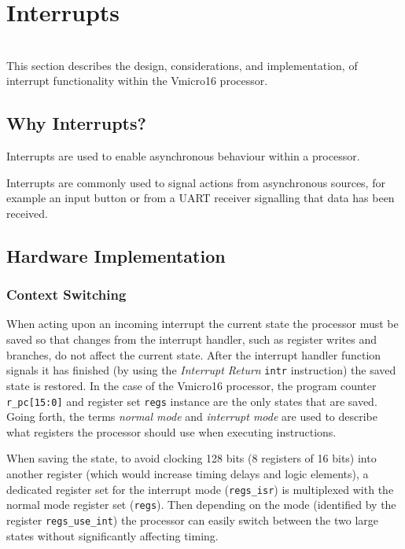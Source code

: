 \chapter{Interrupts}
\label{sect:interrupts}
{%
\startcontents[chapters]
}
\noindent\\
This section describes the design, considerations, and implementation, of interrupt functionality within the Vmicro16 processor.

\section{Why Interrupts?}
Interrupts are used to enable asynchronous behaviour within a processor.

Interrupts are commonly used to signal actions from asynchronous sources, for example an input button or from a UART receiver signalling that data has been received.

\section{Hardware Implementation}

\subsection{Context Switching}
When acting upon an incoming interrupt the current state the processor must be saved so that changes from the interrupt handler, such as register writes and branches, do not affect the current state. After the interrupt handler function signals it has finished (by using the \textit{Interrupt Return} \verb|intr| instruction) the saved state is restored.
In the case of the Vmicro16 processor, the program counter \verb|r_pc[15:0]| and register set \verb|regs| instance are the only states that are saved. Going forth, the terms \textit{normal mode} and \textit{interrupt mode} are used to describe what registers the processor should use when executing instructions.

When saving the state, to avoid clocking 128 bits (8 registers of 16 bits) into another register (which would increase timing delays and logic elements), a dedicated register set for the interrupt mode (\verb|regs_isr|) is multiplexed with the normal mode register set (\verb|regs|). Then depending on the mode (identified by the register \verb|regs_use_int|) the processor can easily switch between the two large states without significantly affecting timing.

